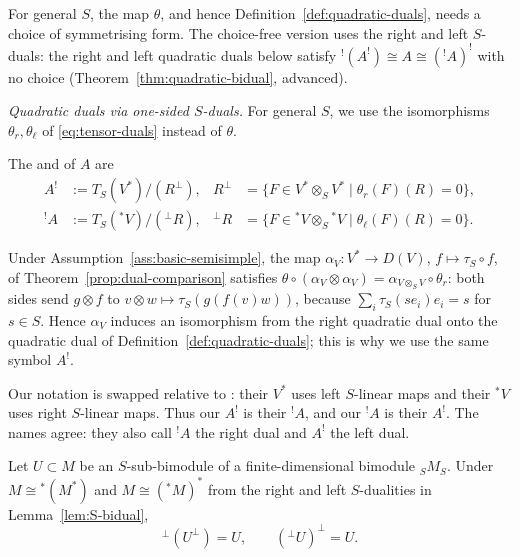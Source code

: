 \begin{advanced}
\begin{remark}[General $S$]
For general $S$, the map $\theta$, and hence Definition~\ref{def:quadratic-duals}, needs a choice of symmetrising form.
The choice-free version uses the right and left $S$-duals: the right and left quadratic duals below satisfy ${}^!(A^!)\cong A\cong({}^!A)^!$ with no choice (Theorem~\ref{thm:quadratic-bidual}, advanced).
\end{remark}

\emph{Quadratic duals via one-sided $S$-duals.}
For general $S$, we use the isomorphisms $\theta_r,\theta_\ell$ of \eqref{eq:tensor-duals} instead of $\theta$.

\begin{definition}\label{def:S-quadratic-duals}
The  and  of $A$ are
\begin{equation}\label{eq:S-quadratic-duals}
\begin{aligned}
A^!&:=T_S(V^*)/(R^\perp),
&R^\perp&=\{F\in V^*\otimes_S V^*\mid\theta_r(F)(R)=0\},\\
{}^!A&:=T_S({}^*V)/({}^\perp R),
&{}^\perp R&=\{F\in{}^*V\otimes_S{}^*V\mid\theta_\ell(F)(R)=0\}.
\end{aligned}
\end{equation}
\end{definition}

Under Assumption~\ref{ass:basic-semisimple}, the map $\alpha_V:V^*\to D(V)$, $f\mapsto\tau_S\circ f$, of Theorem~\ref{prop:dual-comparison} satisfies $\theta\circ(\alpha_V\otimes\alpha_V)=\alpha_{V\otimes_SV}\circ\theta_r$: both sides send $g\otimes f$ to $v\otimes w\mapsto\tau_S(g(f(v)w))$, because $\sum_i\tau_S(se_i)e_i=s$ for $s\in S$.
Hence $\alpha_V$ induces an isomorphism from the right quadratic dual onto the quadratic dual of Definition~\ref{def:quadratic-duals}; this is why we use the same symbol $A^!$.

Our notation is swapped relative to \cite[\S2.7 and Definition~2.8.1]{BGS96}: their $V^*$ uses left $S$-linear maps and their ${}^*V$ uses right $S$-linear maps.
Thus our $A^!$ is their ${}^!A$, and our ${}^!A$ is their $A^!$.
The names agree: they also call ${}^!A$ the right dual and $A^!$ the left dual.

\begin{lemma}\label{lem:S-double-orthogonal}
Let $U\subset M$ be an $S$-sub-bimodule of a finite-dimensional bimodule $ {}_SM_S$.
Under $M\cong{}^*(M^*)$ and $M\cong({}^*M)^*$ from the right and left $S$-dualities in Lemma~\ref{lem:S-bidual},
\[
{}^\perp(U^\perp)=U,\qquad ({}^\perp U)^\perp=U.
\]
\end{lemma}


\end{advanced}
